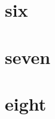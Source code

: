 \documentclass[11pt]{report}
\theoremstyle{definition}
\begin{document}
\chapter{six}

\chapter{seven}

\chapter{eight}

\end{document}
